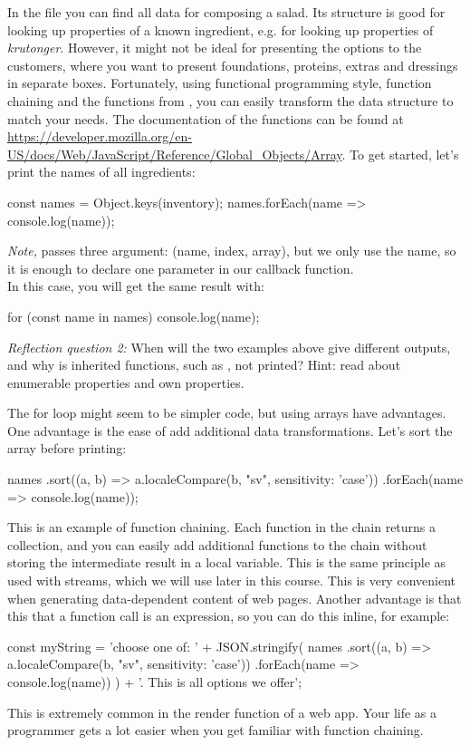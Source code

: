 \documentclass[fleqn, article, a4paper]{memoir}
\begin{document}
\begin{Assignments}
\item In the  file you can find all data for composing a salad. Its structure is good for looking up properties of a known ingredient, e.g.  for looking up properties of \emph{krutonger}. However, it might not be ideal for presenting the options to the customers, where you want to present foundations, proteins, extras and dressings in separate boxes. Fortunately, using functional programming style, function chaining and the functions from , you can easily transform the data structure to match your needs. The documentation of the functions can be found at \url{https://developer.mozilla.org/en-US/docs/Web/JavaScript/Reference/Global_Objects/Array}. To get started, let's print the names of all ingredients:
\begin{Code}
const names = Object.keys(inventory);
names.forEach(name => console.log(name));
\end{Code}
\emph{Note,}  passes three argument: (name, index, array), but we only use the name, so it is enough to declare one parameter in our callback function.
\\In this case, you will get the same result with:
\begin{Code}
for (const name in names) {
  console.log(name);
}
\end{Code}
\emph{Reflection question 2:} When will the two examples above give different outputs, and why is inherited functions, such as , not printed? Hint: read about enumerable properties and own properties.

The for loop might seem to be simpler code, but using arrays have advantages. One advantage is the ease of add additional data transformations. Let's sort the array before printing:
\begin{Code}
names
.sort((a, b) => a.localeCompare(b, "sv", {sensitivity: 'case'}))
.forEach(name => console.log(name));
\end{Code}
This is an example of function chaining. Each function in the chain returns a collection, and you can easily add additional functions to the chain without storing the intermediate result in a local variable. This is the same principle as used with streams, which we will use later in this course. This is very convenient when generating data-dependent content of web pages. Another advantage is that this that a function call is an expression, so you can do this inline, for example:
\begin{Code}
const myString = 'choose one of: ' + JSON.stringify(
names
.sort((a, b) => a.localeCompare(b, "sv", {sensitivity: 'case'}))
.forEach(name => console.log(name))
) + '. This is all options we offer';
\end{Code}
\noindent This is extremely common in the render function of a web app. Your life as a programmer gets a lot easier when you get familiar with function chaining.


\end{Assignments}
\end{document}
